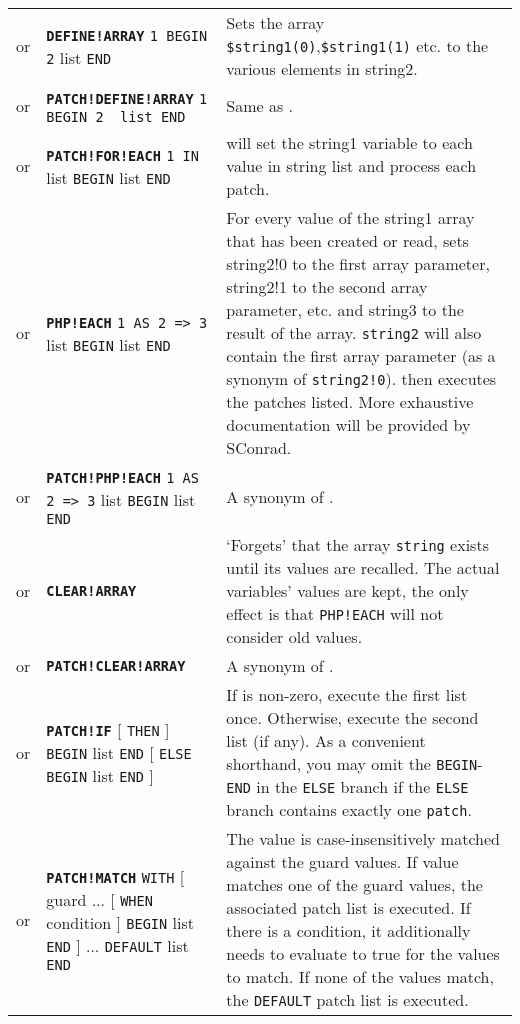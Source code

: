 \documentclass{article}
\def\ttref#1{\ahrefloc{#1}{\tt #1}}
\def\DEFINE#1{{\tt \bf #1}\label{#1}\index{#1}}
\def\t#1{{\tt #1}}
\def\Slist{{\color{red} list }}
\def\Ob{{\color{red} [ }}
\def\Oe{{\color{red} ] }}
\begin{document}
\begin{tabular}{cp{10in}|p{10in}}
or & \DEFINE{DEFINE!ARRAY} \t{\ttref{String}1 BEGIN \ttref{String}2} \Slist \t{END} &
	Sets the array \verb+$string1(0)+,\verb+$string1(1)+ etc. to the various elements in string2.
\\

or & \DEFINE{PATCH!DEFINE!ARRAY} \t{\ttref{String}1 BEGIN \ttref{String}2 \Slist END} &
	Same as \ttref{DEFINE!ARRAY}.
\\


or & \DEFINE{PATCH!FOR!EACH} \t{\ttref{String}1 IN \ttref{String}} \Slist
                             \t{BEGIN} \ttref{patch} \Slist \t{END} &
    will set the string1 variable to each value in string list and process each patch. \\

or & \DEFINE{PHP!EACH} \t{\ttref{String}1 AS \ttref{String}2 => \ttref{String}3} \Slist
                       \t{BEGIN} \ttref{patch} \Slist \t{END} &
    For every value of the string1 array that has been created or read, sets
    string2!0 to the first array parameter, string2!1 to the second array
    parameter, etc. and string3 to the result of the array. \verb+string2+ will also contain
		the first array parameter (as a synonym of \verb+string2!0+). then executes the
    patches listed. More exhaustive documentation will be provided by SConrad.
\\

or & \DEFINE{PATCH!PHP!EACH} \t{\ttref{String}1 AS \ttref{String}2 => \ttref{String}3} \Slist
                             \t{BEGIN} \ttref{patch} \Slist \t{END} &
    A synonym of \ttref{PHP!EACH}.
\\

or & \DEFINE{CLEAR!ARRAY} \ttref{String} &
    `Forgets' that the array \t{string} exists until its values are recalled.
    The actual variables' values are kept, the only effect is that \t{*PHP!EACH}
    will not consider old values.
\\

or & \DEFINE{PATCH!CLEAR!ARRAY} \ttref{String} &
    A synonym of \ttref{CLEAR!ARRAY}.
\\


or & \DEFINE{PATCH!IF} \ttref{value} \Ob \t{THEN} \Oe \t{BEGIN}
  \ttref{patch} \Slist \t{END}
  \Ob \t{ELSE} \t{BEGIN} \ttref{patch} \Slist \t{END} \Oe
  &
  If \ttref{value} is non-zero, execute the first \ttref{patch} \Slist
  once. Otherwise, execute the second \ttref{patch} \Slist (if any). As a
  convenient shorthand, you may omit the \t{BEGIN}-\t{END} in the \t{ELSE}
  branch if the \t{ELSE} branch contains exactly one \t{patch}.
  \\
  or & \DEFINE{PATCH!MATCH} \ttref{value} \t{WITH} \Ob guard\ttref{value} ...
    \Ob \t{WHEN} condition\ttref{value} \Oe
    \t{BEGIN} \ttref{patch} \Slist \t{END} \Oe
    ... \t{DEFAULT} \ttref{patch} \Slist \t{END} &
    The value is case-insensitively matched against the guard
    values. If value matches one of the guard values, the associated
    patch list is executed. If there is a condition, it additionally
    needs to evaluate to true for the values to match. If none
    of the values match, the \t{DEFAULT} patch list is executed.


\end{tabular}
\end{document}
